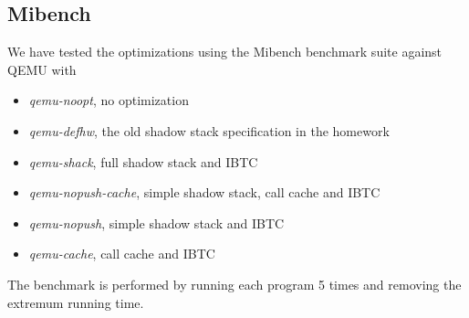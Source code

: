 \documentclass{article}
\begin{document}
\subsection{Mibench}
We have tested the optimizations using the Mibench benchmark suite against QEMU with
\begin{itemize}
\item \textit{qemu-noopt}, no optimization
\item \textit{qemu-defhw}, the old shadow stack specification in the homework
\item \textit{qemu-shack}, full shadow stack and IBTC
\item \textit{qemu-nopush-cache}, simple shadow stack, call cache and IBTC
\item \textit{qemu-nopush}, simple shadow stack and IBTC
\item \textit{qemu-cache}, call cache and IBTC
\end{itemize}
The benchmark is performed by running each program 5 times and removing the extremum running time.
\end{document}
